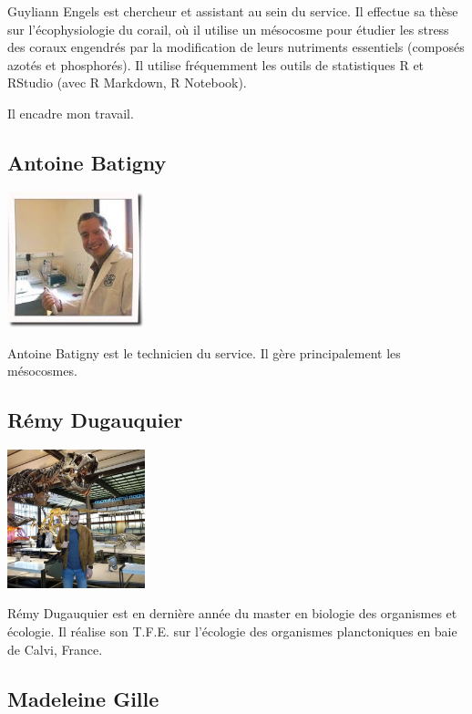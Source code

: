\documentclass[]{report}
\begin{document}
Guyliann Engels est chercheur et assistant au sein du service. Il
effectue sa thèse sur l'écophysiologie du corail, où il utilise un
mésocosme pour étudier les stress des coraux engendrés par la
modification de leurs nutriments essentiels (composés azotés et
phosphorés). Il utilise fréquemment les outils de statistiques R et
RStudio (avec R Markdown, R Notebook).

Il encadre mon travail.

\subsection{Antoine Batigny}\label{antoine-batigny}

\includegraphics[width=4.00000cm]{../image/antoine2.jpg}

Antoine Batigny est le technicien du service. Il gère principalement les
mésocosmes.

\subsection{Rémy Dugauquier}\label{remy-dugauquier}

\includegraphics[width=4.00000cm]{../image/remy.jpg}

Rémy Dugauquier est en dernière année du master en biologie des
organismes et écologie. Il réalise son T.F.E. sur l'écologie des
organismes planctoniques en baie de Calvi, France.

\subsection{Madeleine Gille}\label{madeleine-gille}
\end{document}
